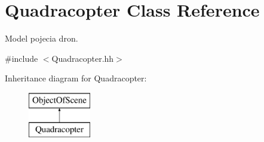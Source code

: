 \hypertarget{class_quadracopter}{}\section{Quadracopter Class Reference}
\label{class_quadracopter}


Model pojecia dron.  




{\ttfamily \#include $<$Quadracopter.\+hh$>$}

Inheritance diagram for Quadracopter\+:\begin{figure}[H]
\begin{center}
\leavevmode
\includegraphics[height=2.000000cm]{class_quadracopter}
\end{center}
\end{figure}
